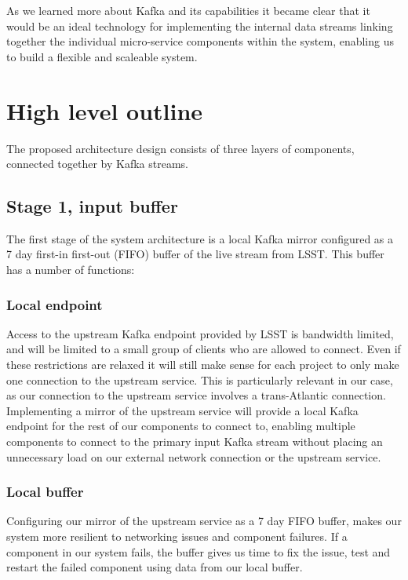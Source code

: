 \documentclass{article}
\newcommand{\scaleable} {scaleable\xspace}
\newcommand{\kafka} {Kafka\xspace}
\newcommand{\fifo} {FIFO\xspace}
\newcommand{\lsst} {LSST\xspace}
\begin{document}
As we learned more about \kafka and its capabilities it became clear that it would be an ideal technology for implementing the internal data streams linking together the individual micro-service components within the system, enabling us to build a flexible and \scaleable system.


\section{High level outline}
\label{high-level-outline}

The proposed architecture design consists of three layers of components, connected together by \kafka streams.

\subsection{Stage 1, input buffer}
\label{stage-1}

The first stage of the system architecture is a local \kafka mirror configured as a 7 day first-in first-out (\fifo) buffer of the live stream from \lsst. This buffer has a number of functions:

\subsubsection{Local endpoint}
\label{stage-1.local-endpoint}
Access to the upstream \kafka endpoint provided by \lsst is bandwidth limited, and will be limited to a small group of clients who are allowed to connect. Even if these restrictions are relaxed it will still make sense for each project to only make one connection to the upstream service.
This is particularly relevant in our case, as our connection to the upstream service involves a trans-Atlantic connection.
Implementing a mirror of the upstream service will provide a local \kafka endpoint for the rest of our components to connect to, enabling multiple components to connect to the primary input \kafka stream without placing an unnecessary load on our external network connection or the upstream service.

\subsubsection{Local buffer}
\label{stage-1.local-buffer}
Configuring our mirror of the upstream service as a 7 day \fifo buffer, makes our system more resilient to networking issues and component failures.
If a component in our system fails, the buffer gives us time to fix the issue, test and restart the failed component using data from our local buffer.
\end{document}
